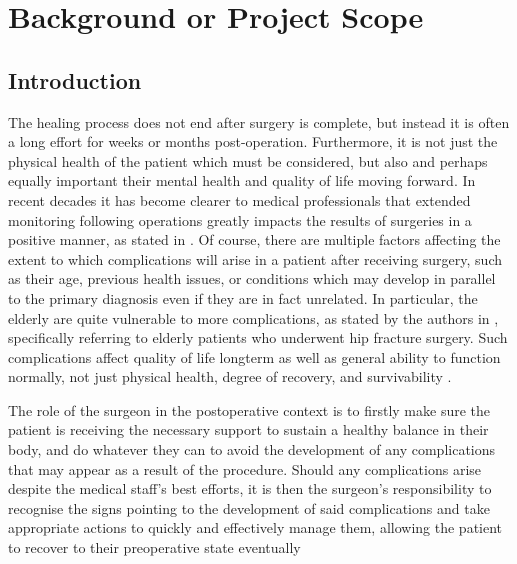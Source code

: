\chapter{Background or Project Scope}

\section{Introduction} %
The healing process does not end after surgery is complete, but instead it is often a long effort for weeks or months post-operation. Furthermore, it is not just the physical health of the patient which must be considered, but also and perhaps equally important their mental health and quality of life moving forward. In recent decades it has become clearer to medical professionals that extended monitoring following operations greatly impacts the results of surgeries in a positive manner, as stated in \cite{d2014defining}. Of course, there are multiple factors affecting the extent to which complications will arise in a patient after receiving surgery, such as their age, previous health issues, or conditions which may develop in parallel to the primary diagnosis even if they are in fact unrelated. In particular, the elderly are quite vulnerable to more complications, as stated by the authors in \cite{kare2024post}, specifically referring to elderly patients who underwent hip fracture surgery. Such complications affect quality of life longterm as well as general ability to function normally, not just physical health, degree of recovery, and survivability \cite{kare2024post}.

The role of the surgeon in the postoperative context is to firstly make sure the patient is receiving the necessary support to sustain a healthy balance in their body, and do whatever they can to avoid the development of any complications that may appear as a result of the procedure. Should any complications arise despite the medical staff's best efforts, it is then the surgeon's responsibility to recognise the signs pointing to the development of said complications and take appropriate actions to quickly and effectively manage them, allowing the patient to recover to their preoperative state eventually \cite{Surwit_Tam_2008}

